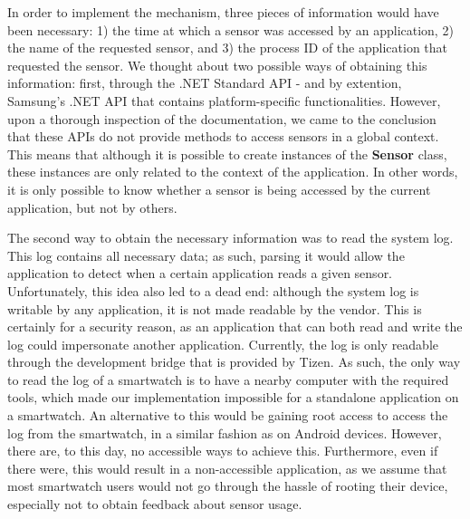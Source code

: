\documentclass[conference, a4paper, 10pt, twocolumn]{IEEEtran}
\begin{document}
In order to implement the mechanism, three pieces of information would have been necessary: 1) the time at which a sensor was accessed by an application, 2) the name of the requested sensor, and 3) the process ID of the application that requested the sensor. We thought about two possible ways of obtaining this information: first, through the .NET Standard \ac{API} - and by extention, Samsung's .NET \ac{API} that contains platform-specific functionalities\cite{tizen}. However, upon a thorough inspection of the documentation, we came to the conclusion that these \acp{API} do not provide methods to access sensors in a global context. This means that although it is possible to create instances of the \textbf{Sensor} class, these instances are only related to the context of the application. In other words, it is only possible to know whether a sensor is being accessed by the current application, but not by others. 

The second way to obtain the necessary information was to read the system log. This log contains all necessary data; as such, parsing it would allow the application to detect when a certain application reads a given sensor. Unfortunately, this idea also led to a dead end: although the system log is writable by any application, it is not made readable by the vendor. This is certainly for a security reason, as an application that can both read and write the log could impersonate another application. Currently, the log is only readable through the development bridge that is provided by Tizen. As such, the only way to read the log of a smartwatch is to have a nearby computer with the required tools, which made our implementation impossible for a standalone application on a smartwatch. An alternative to this would be gaining root access to access the log from the smartwatch, in a similar fashion as on Android devices. However, there are, to this day, no accessible ways to achieve this. Furthermore, even if there were, this would result in a non-accessible application, as we assume that most smartwatch users would not go through the hassle of rooting their device, especially not to obtain feedback about sensor usage. 

\end{document}
